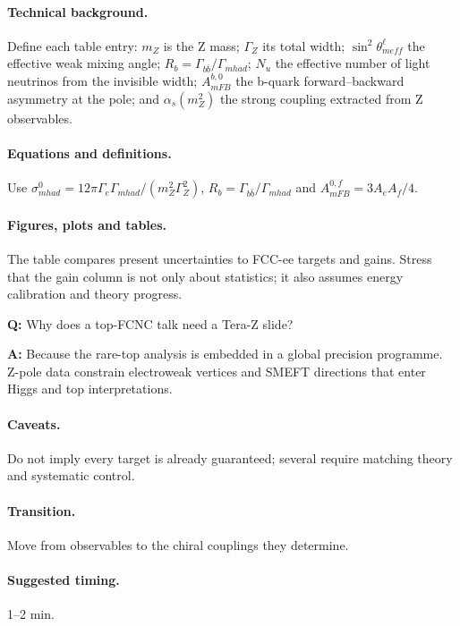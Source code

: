 \documentclass[11pt,a4paper]{report}
\begin{document}
\paragraph{Technical background.}
Define each table entry: $m_Z$ is the Z mass; $\Gamma_Z$ its total width; $\sin^2\theta_{
m eff}^\ell$ the effective weak mixing angle; $R_b=\Gamma_{b\bar b}/\Gamma_{
m had}$; $N_
u$ the effective number of light neutrinos from the invisible width; $A_{
m FB}^{b,0}$ the b-quark forward--backward asymmetry at the pole; and $\alpha_s(m_Z^2)$ the strong coupling extracted from Z observables.

\paragraph{Equations and definitions.}
Use $\sigma^0_{
m had}=12\pi\Gamma_e\Gamma_{
m had}/(m_Z^2\Gamma_Z^2)$, $R_b=\Gamma_{b\bar b}/\Gamma_{
m had}$ and $A_{
m FB}^{0,f}=3A_eA_f/4$.

\paragraph{Figures, plots and tables.}
The table compares present uncertainties to FCC-ee targets and gains.  Stress that the gain column is not only about statistics; it also assumes energy calibration and theory progress.

\begin{questionbox}
\textbf{Q:} Why does a top-FCNC talk need a Tera-Z slide?\par
\textbf{A:} Because the rare-top analysis is embedded in a global precision programme.  Z-pole data constrain electroweak vertices and SMEFT directions that enter Higgs and top interpretations.
\end{questionbox}

\paragraph{Caveats.}
Do not imply every target is already guaranteed; several require matching theory and systematic control.

\paragraph{Transition.}
Move from observables to the chiral couplings they determine.

\paragraph{Suggested timing.}
1--2 min.
\end{document}
